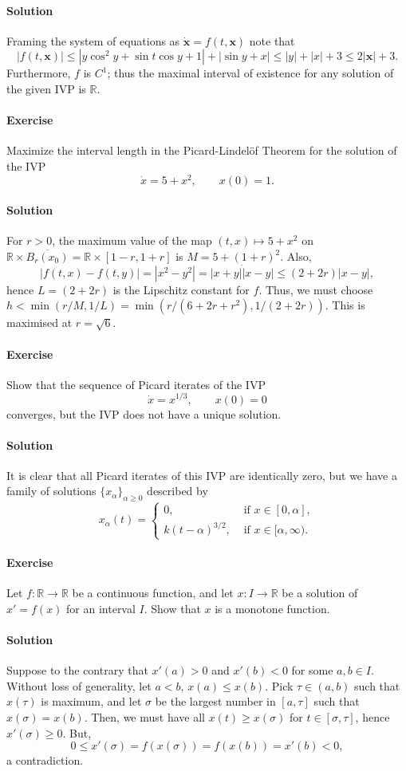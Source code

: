 \documentclass[10pt]{article}
\newcounter{prob}
\newcommand{\problem}{\stepcounter{prob}\paragraph{Exercise \arabic{prob}}}
\newcommand{\solution}{\paragraph{Solution}}
\newcommand{\R}{\mathbb{R}}
\begin{document}
    \solution Framing the system of equations as $\dot{\bm{x}} = f(t, \bm{x})$ note
    that \[
        |f(t, \bm{x})| \leq |y\cos^2{y} + \sin{t}\cos{y} + 1| + |\sin{y} + x|
        \leq |y| + |x| + 3 \leq 2|\bm{x}| + 3.
    \] Furthermore, $f$ is $C^1$; thus the maximal interval of existence for any
    solution of the given IVP is $\R$.


    \problem Maximize the interval length in the Picard-Lindel\"of Theorem for the
    solution of the IVP \[
        \dot{x} = 5 + x^2, \qquad
        x(0) = 1.
    \]

    \solution For $r > 0$, the maximum value of the map $(t, x) \mapsto 5 + x^2$ on
    $\R\times \overline{B_r(x_0)} = \R\times [1 - r, 1 + r]$ is $M = 5 + (1 + r)^2$.
    Also, \[
        |f(t, x) - f(t, y)| = |x^2 - y^2| = |x + y|\dot |x - y| \leq (2 + 2r) |x -
        y|,
    \] hence $L = (2 + 2r)$ is the Lipschitz constant for $f$. Thus, we must choose
    $h < \min(r/M, 1/L) = \min(r/(6 + 2r + r^2), 1/(2 + 2r))$. This is maximised at
    $r = \sqrt{6}$.


    \problem Show that the sequence of Picard iterates of the IVP \[
        \dot{x} = x^{1 / 3}, \qquad
        x(0) = 0
    \] converges, but the IVP does not have a unique solution.

    \solution It is clear that all Picard iterates of this IVP are identically zero,
    but we have a family of solutions $\{x_\alpha\}_{\alpha \geq 0}$ described by
    \[
            x_\alpha(t) = \begin{cases}
                0, &\text{ if } x \in [0, \alpha], \\
                k(t - \alpha)^{3 / 2}, &\text{ if } x \in [\alpha, \infty).
            \end{cases}
    \]


    \problem Let $f\colon \R \to \R$ be a continuous function, and let $x\colon I \to
    \R$ be a solution of $x' = f(x)$ for an interval $I$. Show that $x$ is a monotone
    function.

    \solution Suppose to the contrary that $x'(a) > 0$ and $x'(b) < 0$ for some $a, b
    \in I$. Without loss of generality, let $a < b$, $x(a) \leq x(b)$. Pick $\tau \in
    (a, b)$ such that $x(\tau)$ is maximum, and let $\sigma$ be the largest number in
    $[a, \tau]$ such that $x(\sigma) = x(b)$. Then, we must have all $x(t) \geq
    x(\sigma)$ for $t \in [\sigma, \tau]$, hence $x'(\sigma) \geq 0$. But, \[
        0 \leq x'(\sigma) = f(x(\sigma)) = f(x(b)) = x'(b) < 0,
    \] a contradiction.
\end{document}

